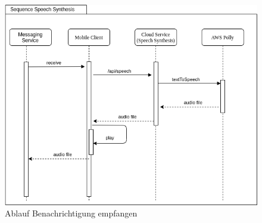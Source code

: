 \begin{figure}[h]
    \centering
    \begin{minipage}[b]{0.9\textwidth}
        \includegraphics[width=\textwidth]{graphics/diagramms/Sequence_Speech_Synth_V01}
        \caption{Ablauf Benachrichtigung empfangen}
    \end{minipage}
\end{figure}

\clearpage
